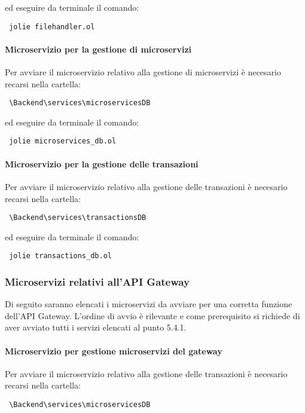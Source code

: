 	ed eseguire da terminale il comando:
	
	\begin{center}
		\verb| jolie filehandler.ol |
	\end{center}

	\paragraph{Microservizio per la gestione di microservizi}
	Per avviare il microservizio relativo alla gestione di microservizi è necesario recarsi nella cartella:
	\begin{center}
		\verb| \Backend\services\microservicesDB|
	\end{center}
	
	ed eseguire da terminale il comando:
	
	\begin{center}
		\verb| jolie microservices_db.ol |
	\end{center}

	\paragraph{Microservizio per la gestione delle transazioni}
Per avviare il microservizio relativo alla gestione delle transazioni è necesario recarsi nella cartella:
\begin{center}
	\verb| \Backend\services\transactionsDB|
\end{center}

ed eseguire da terminale il comando:

\begin{center}
	\verb| jolie transactions_db.ol |
\end{center}

\subsubsection{Microservizi relativi all'API Gateway}
Di seguito saranno elencati i microservizi da avviare per una corretta funzione dell'API Gateway. L'ordine di avvio  è rilevante e come prerequisito si richiede di aver avviato tutti i servizi elencati al punto 5.4.1.

\paragraph{Microservizio per gestione microservizi del gateway}
	Per avviare il microservizio relativo alla gestione delle transazioni è necesario recarsi nella cartella:
	\begin{center}
		\verb| \Backend\services\microservicesDB|
	\end{center}
	
